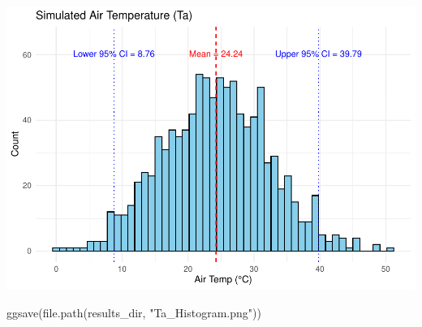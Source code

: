 \documentclass[
]{article}
\newenvironment{Shaded}{\begin{snugshade}}{\end{snugshade}}
\newcommand{\FunctionTok}[1]{\textcolor[rgb]{0.00,0.00,0.00}{#1}}
\newcommand{\NormalTok}[1]{#1}
\newcommand{\StringTok}[1]{\textcolor[rgb]{0.31,0.60,0.02}{#1}}
\begin{document}
\includegraphics{V1075_MonteCarlo_Report_files/figure-latex/unnamed-chunk-5-1.pdf}

\begin{Shaded}
\begin{Highlighting}[]
\FunctionTok{ggsave}\NormalTok{(}\FunctionTok{file.path}\NormalTok{(results\_dir, }\StringTok{"Ta\_Histogram.png"}\NormalTok{))}
\end{Highlighting}
\end{Shaded}
\end{document}
